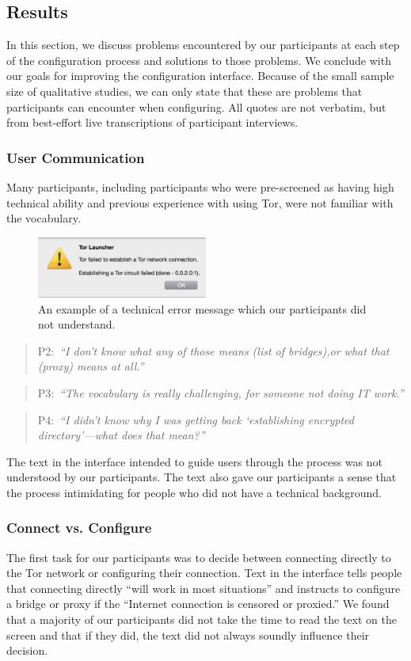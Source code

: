 \documentclass[USenglish,oneside,twocolumn]{article}
\newcommand{\pquote}[2]{
\begin{quotation}
\noindent #1:~\textit{``#2''}
\end{quotation}
}
\begin{document}
\subsection{Results} 
In this section, we discuss problems encountered by our participants at each step of the configuration process and solutions to those problems. We conclude with our goals for improving the configuration interface. Because of the small sample size of qualitative studies, we can only state that these are problems that participants can encounter when configuring. All quotes are not verbatim, but from best-effort live transcriptions of participant interviews.

\subsubsection{User Communication} 
Many participants, including participants who were pre-screened as having high technical ability and previous experience with using Tor, were not familiar with the vocabulary. 

\begin{figure}[t]
  \centering
    \includegraphics[width=0.5\textwidth]{error.png}
    \caption{An example of a technical error message which our participants did not understand.}
\label{fig:error}
\end{figure}

\pquote{P2}{I don't know what any of those means (list of bridges),or what that (proxy) means at all.}
\pquote{P3}{The vocabulary is really challenging, for someone not doing IT work.}
\pquote{P4}{I didn't know why I was getting back `establishing encrypted directory'---what does that mean?}
The text in the interface intended to guide users through the process was not understood by our participants. The text also gave our participants a sense that the process intimidating for people who did not have a technical background. 

\subsubsection{Connect vs. Configure} 
The first task for our participants was to decide between connecting directly to the Tor network or configuring their connection. Text in the interface tells people that connecting directly ``will work in most situations'' and instructs to configure a bridge or proxy if the ``Internet connection is censored or proxied.'' We found that a majority of our participants did not take the time to read the text on the screen and that if they did, the text did not always soundly influence their decision.
\end{document}

